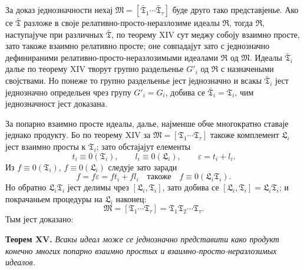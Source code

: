 ﻿\documentclass[11pt]{article}
\newcommand{\ideal}[1]{\mathfrak{#1}}
\begin{document}
За доказ једнозначности нехај \(\ideal M=[\bar{\ideal T}_1\cdots\bar{\ideal T}_\tau]\) буде друго тако представјенье. Ако се \(\bar{\ideal T}\) разложе в своје релативно-просто-неразлозиме идеалы \(\ideal R\), тогда \(\ideal R\), наступајуче при различных \(\bar{\ideal T}\), по теорему XIV сут меджу собоју взаимно просте, зато такоже взаимно релативно просте; оне совпадајут зато с једнозначно дефинираними релативно-просто-неразлозимыми идеалами \(\ideal R\) од \(\ideal M\). Идеалы \(\bar{\ideal T}_i\) далье по теорему XIV творут групно раздельенье \(G'_i\) од \(\ideal R\) с назначеными својствами. Но понеже то групно раздельенье јест једнозначно и всакы \(\bar{\ideal T}_i\) јест једнозначно определьен чрез групу \(G'_i=G_i\), добива се \(\bar{\ideal T}_i=\ideal T_i\), чим једнозначност јест доказана.

За попарно взаимно просте идеалы, далье, најменше обче многократно ставаје једнако продукту. Бо по теорему XIV за \(\ideal M=[\ideal T_1\cdots\ideal T_\tau]\) такоже комплемент \(\ideal L_i\) јест взаимно просты к \(\ideal T_i\); зато обстајајут елементы
\[
 t_i\equiv0(\ideal T_i),
 \qquad
 l_i\equiv0(\ideal L_i),
 \qquad
 \varepsilon=t_i+l_i.
\]
Из \(f\equiv0(\ideal T_i)\), \(f\equiv0(\ideal L_i)\) следује зато заради
\[
 f=f\varepsilon=ft_i+fl_i
 \quad\text{такоже}\quad
 f\equiv0(\ideal L_i\ideal T_i).
\]
Но обратно \(\ideal L_i\ideal T_i\) јест делимы чрез \([\ideal L_i,\ideal T_i]\), зато добива се \([\ideal L_i,\ideal T_i]=\ideal L_i\ideal T_i\); и покрачаньем процедуры на \(\ideal L_i\) наконец:
\[
 \ideal M=[\ideal T_1\cdots\ideal T_\tau]
       =\ideal T_1\ideal T_2\cdots\ideal T_\tau.
\]
Тым јест доказано:

\textbf{Теорем XV.} \emph{Всакы идеал може се једнозначно представити како продукт конечно многих попарно взаимно простых и взаимно-просто-неразлозимых идеалов.}
\end{document}
